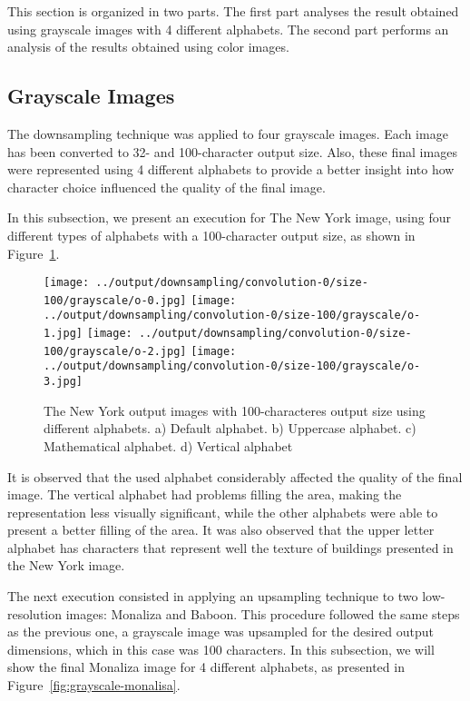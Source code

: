 \documentclass[]{IEEEtran}
\begin{document}
This section is organized in two parts. The first part analyses the result obtained using grayscale images with 4 different alphabets. The second part performs an analysis of the results obtained using color images.

\subsection{Grayscale Images}

The downsampling technique was applied to four grayscale images. Each image has been converted to 32- and 100-character output size. Also, these final images were represented using 4 different alphabets to provide a better insight into how character choice influenced the quality of the final image.

In this subsection, we present an execution for The New York image, using four different types of alphabets with a 100-character output size, as shown in Figure~\ref{fig:grayscale-nyc}.

\begin{figure}[H]
    \centering
    \texttt{[image: ../output/downsampling/convolution-0/size-100/grayscale/o-0.jpg]}
    \texttt{[image: ../output/downsampling/convolution-0/size-100/grayscale/o-1.jpg]}
    \texttt{[image: ../output/downsampling/convolution-0/size-100/grayscale/o-2.jpg]}
    \texttt{[image: ../output/downsampling/convolution-0/size-100/grayscale/o-3.jpg]}
    \caption{The New York output images with 100-characteres output size using different alphabets. a) Default alphabet. b) Uppercase alphabet. c) Mathematical alphabet. d)
    Vertical alphabet}
    \label{fig:grayscale-nyc}
\end{figure}

It is observed that the used alphabet considerably affected the quality of the final image. The vertical alphabet had problems filling the area, making the representation less visually significant, while the other alphabets were able to present a better filling of the area. It was also observed that the upper letter alphabet has characters that represent well the texture of buildings presented in the New York image.

The next execution consisted in applying an upsampling technique to two low-resolution images: Monaliza and Baboon. This procedure followed the same steps as the previous one, a grayscale image was upsampled for the desired output dimensions, which in this case was 100 characters. In this subsection, we will show the final Monaliza image for 4 different alphabets, as presented in Figure~\ref{fig:grayscale-monalisa}.
\end{document}
